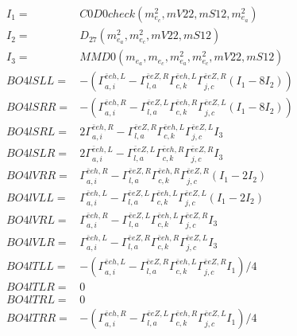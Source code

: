 \documentclass[A4,landscape]{article}
\begin{document}
\begin{align} 
I_1 = & C0D0check(m^2_{e_{{c}}}, mV22, mS12, m^2_{e_{{a}}}) \\ 
I_2 = & D_{27}(m^2_{e_{{a}}}, m^2_{e_{{c}}}, mV22, mS12) \\ 
I_3 = & MMD0(m_{e_{{a}}}, m_{e_{{c}}}, m^2_{e_{{a}}}, m^2_{e_{{c}}}, mV22, mS12) \\ 
  BO4lSLL= & -( \Gamma^{\bar{e}e h ,L}_{a, i} - \Gamma^{\bar{e}e Z ,R} _{l, a} \Gamma^{\bar{e}e h ,L}_{c, k} \Gamma^{\bar{e}e Z ,R}_{j, c} (I_1 - 8 I_2)) \\ 
  BO4lSRR= & -( \Gamma^{\bar{e}e h ,R}_{a, i} - \Gamma^{\bar{e}e Z ,L} _{l, a} \Gamma^{\bar{e}e h ,R}_{c, k} \Gamma^{\bar{e}e Z ,L}_{j, c} (I_1 - 8 I_2)) \\ 
  BO4lSRL= & 2  \Gamma^{\bar{e}e h ,R}_{a, i} - \Gamma^{\bar{e}e Z ,R} _{l, a} \Gamma^{\bar{e}e h ,L}_{c, k} \Gamma^{\bar{e}e Z ,L}_{j, c} I_3 \\ 
  BO4lSLR= & 2  \Gamma^{\bar{e}e h ,L}_{a, i} - \Gamma^{\bar{e}e Z ,L} _{l, a} \Gamma^{\bar{e}e h ,R}_{c, k} \Gamma^{\bar{e}e Z ,R}_{j, c} I_3 \\ 
  BO4lVRR= &  \Gamma^{\bar{e}e h ,R}_{a, i} - \Gamma^{\bar{e}e Z ,R} _{l, a} \Gamma^{\bar{e}e h ,R}_{c, k} \Gamma^{\bar{e}e Z ,R}_{j, c} (I_1 - 2 I_2) \\ 
  BO4lVLL= &  \Gamma^{\bar{e}e h ,L}_{a, i} - \Gamma^{\bar{e}e Z ,L} _{l, a} \Gamma^{\bar{e}e h ,L}_{c, k} \Gamma^{\bar{e}e Z ,L}_{j, c} (I_1 - 2 I_2) \\ 
  BO4lVRL= &  \Gamma^{\bar{e}e h ,R}_{a, i} - \Gamma^{\bar{e}e Z ,L} _{l, a} \Gamma^{\bar{e}e h ,L}_{c, k} \Gamma^{\bar{e}e Z ,R}_{j, c} I_3 \\ 
  BO4lVLR= &  \Gamma^{\bar{e}e h ,L}_{a, i} - \Gamma^{\bar{e}e Z ,R} _{l, a} \Gamma^{\bar{e}e h ,R}_{c, k} \Gamma^{\bar{e}e Z ,L}_{j, c} I_3 \\ 
  BO4lTLL= & -( \Gamma^{\bar{e}e h ,L}_{a, i} - \Gamma^{\bar{e}e Z ,R} _{l, a} \Gamma^{\bar{e}e h ,L}_{c, k} \Gamma^{\bar{e}e Z ,R}_{j, c} I_1)/4 \\ 
  BO4lTLR= & 0 \\ 
  BO4lTRL= & 0 \\ 
  BO4lTRR= & -( \Gamma^{\bar{e}e h ,R}_{a, i} - \Gamma^{\bar{e}e Z ,L} _{l, a} \Gamma^{\bar{e}e h ,R}_{c, k} \Gamma^{\bar{e}e Z ,L}_{j, c} I_1)/4 \\ 
\end{align} 
\end{document}

